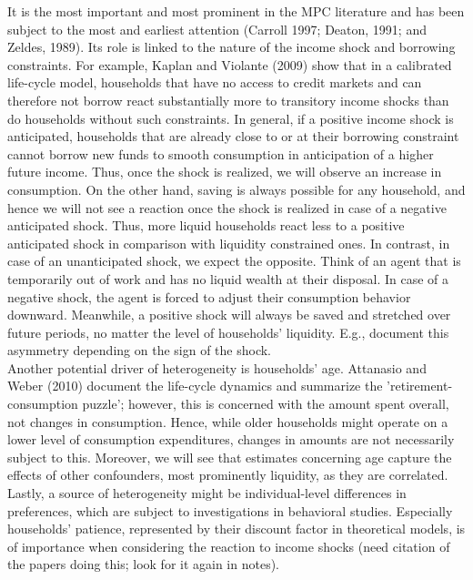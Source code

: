 It is the most important and most prominent in the MPC literature and has been subject to the most and earliest attention (Carroll 1997; Deaton, 1991; and Zeldes, 1989). Its role is linked to the nature of the income shock and borrowing constraints. For example, Kaplan and Violante (2009) show that in a calibrated life-cycle model, households that have no access to credit markets and can therefore not borrow react substantially more to transitory income shocks than do households without such constraints. In general, if a positive income shock is anticipated, households that are already close to or at their borrowing constraint cannot borrow new funds to smooth consumption in anticipation of a higher future income. Thus, once the shock is realized, we will observe an increase in consumption. On the other hand, saving is always possible for any household, and hence we will not see a reaction once the shock is realized in case of a negative anticipated shock. Thus, more liquid households react less to a positive anticipated shock in comparison with liquidity constrained ones. In contrast, in case of an unanticipated shock, we expect the opposite. Think of an agent that is temporarily out of work and has no liquid wealth at their disposal. In case of a negative shock, the agent is forced to adjust their consumption behavior downward. Meanwhile, a positive shock will always be saved and stretched over future periods, no matter the level of households' liquidity. E.g., \cite{bunn_etal} document this asymmetry depending on the sign of the shock. \\
Another potential driver of heterogeneity is households' age. Attanasio and Weber (2010) document the life-cycle dynamics and summarize the 'retirement-consumption puzzle'; however, this is concerned with the amount spent overall, not changes in consumption. Hence, while older households might operate on a lower level of consumption expenditures, changes in amounts are not necessarily subject to this. Moreover, we will see that estimates concerning age capture the effects of other confounders, most prominently liquidity, as they are correlated. \\
Lastly, a source of heterogeneity might be individual-level differences in preferences, which are subject to investigations in behavioral studies. Especially households' patience, represented by their discount factor in theoretical models, is of importance when considering the reaction to income shocks (need citation of the papers doing this; look for it again in notes).
